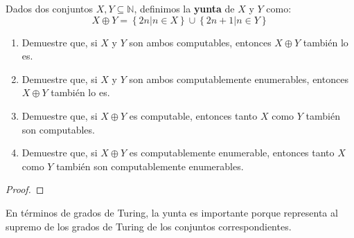 \documentclass[12pt]{report}
\newcounter{it}
\theoremstyle{largebreak}
\begin{document}
    \begin{excer}
        Dados dos conjuntos $X,Y\subseteq\mathbb{N}$, definimos la \textbf{yunta} de $X$ y $Y$ como:
        \begin{equation*}
            X\oplus Y=\left\{2n\Big|n\in X \right\}\cup\left\{2n+1\Big|n\in Y \right\}
        \end{equation*}
        \begin{enumerate}[label = \textit{(\alph*)}]
            \item Demuestre que, si $X$ y $Y$ son ambos computables, entonces $X\oplus Y$ también lo es.
            \item Demuestre que, si $X$ y $Y$ son ambos computablemente enumerables, entonces $X\oplus Y$ también lo es.
            \item Demuestre que, si $X\oplus Y$ es computable, entonces tanto $X$ como $Y$ también son computables.
            \item Demuestre que, si $X\oplus Y$ es computablemente enumerable, entonces tanto $X$ como $Y$ también son computablemente enumerables.
        \end{enumerate}
    \end{excer}

    \begin{proof}
        
    \end{proof}

    \begin{obs}
        En términos de grados de Turing, la yunta es importante porque representa al supremo de los grados de Turing de los conjuntos correspondientes.
    \end{obs}
\end{document}
